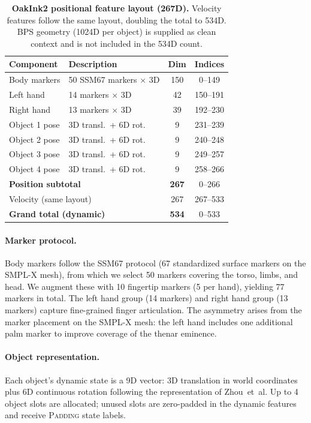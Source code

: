\documentclass[sigconf, screen, review, anonymous]{acmart}
\begin{document}
\begin{table}[t]
  \caption{\textbf{OakInk2 positional feature layout (267D).} Velocity features follow the same layout, doubling the total to 534D. BPS geometry (1024D per object) is supplied as clean context and is not included in the 534D count.}
  \label{tab:oakink2_layout}
  \centering
  \small
  \begin{tabular}{@{}llcc@{}}
    \toprule
    Component & Description & Dim & Indices \\
    \midrule
    Body markers & 50 SSM67 markers $\times$ 3D & 150 & 0--149 \\
    Left hand & 14 markers $\times$ 3D & 42 & 150--191 \\
    Right hand & 13 markers $\times$ 3D & 39 & 192--230 \\
    Object 1 pose & 3D transl.\ + 6D rot. & 9 & 231--239 \\
    Object 2 pose & 3D transl.\ + 6D rot. & 9 & 240--248 \\
    Object 3 pose & 3D transl.\ + 6D rot. & 9 & 249--257 \\
    Object 4 pose & 3D transl.\ + 6D rot. & 9 & 258--266 \\
    \midrule
    \multicolumn{2}{l}{\textbf{Position subtotal}} & \textbf{267} & 0--266 \\
    \multicolumn{2}{l}{Velocity (same layout)} & 267 & 267--533 \\
    \midrule
    \multicolumn{2}{l}{\textbf{Grand total (dynamic)}} & \textbf{534} & 0--533 \\
    \bottomrule
  \end{tabular}
\end{table}

\paragraph{Marker protocol.}
Body markers follow the SSM67 protocol (67 standardized surface markers on the SMPL-X mesh), from which we select 50 markers covering the torso, limbs, and head. We augment these with 10 fingertip markers (5 per hand), yielding 77 markers in total. The left hand group (14 markers) and right hand group (13 markers) capture fine-grained finger articulation. The asymmetry arises from the marker placement on the SMPL-X mesh: the left hand includes one additional palm marker to improve coverage of the thenar eminence.

\paragraph{Object representation.}
Each object's dynamic state is a 9D vector: 3D translation in world coordinates plus 6D continuous rotation following the representation of Zhou~et~al. Up to 4 object slots are allocated; unused slots are zero-padded in the dynamic features and receive \textsc{Padding} state labels.
\end{document}
